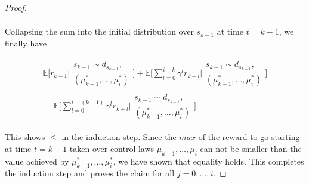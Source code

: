 \documentclass[11pt]{article} %
\begin{document}
\begin{proof}
\begin{equation}
\begin{array}{rll}
	\end{array}
\end{equation}

Collapsing the sum into the initial distribution over $s_{k-1}$ at time $t = k-1$, we finally have

\begin{equation}
	\begin{array}{rcl}
		\mathbb{E}\Big[ r_{k-1} \Big| \begin{array}{c}
											s_{k-1} \sim d_{s_{k-1}}, \\
											(\mu_{k-1}^*,\dots,\mu_i^*)
										\end{array} \Big] + \mathbb{E}\Big[ \sum\limits_{l=0}^{i-k} \gamma^l r_{k+l} \Big| \begin{array}{c}
																																s_{k-1} \sim d_{s_{k-1}}, \\
																																(\mu_{k-1}^*,\dots,\mu_i^*)
																															\end{array} \Big] \\
		= \mathbb{E}\Big[ \sum\limits_{l=0}^{i-(k-1)} \gamma^l r_{k+l} \Big| \begin{array}{c}
																				s_{k-1} \sim d_{s_{k-1}}, \\
																				(\mu_{k-1}^*,\dots,\mu_i^*)
																			\end{array} \Big] .
	\end{array}
\end{equation}

This shows $\le$ in the induction step. Since the $max$ of the reward-to-go starting at time $t = k-1$ taken over control laws $\mu_{k-1},\dots,\mu_i$ can not be smaller than the value achieved by $\mu_{k-1}^*,\dots,\mu_i^*$, we have shown that equality holds. This completes the induction step and proves the claim for all $j = 0,\dots,i$.

\end{proof}
\end{document}
